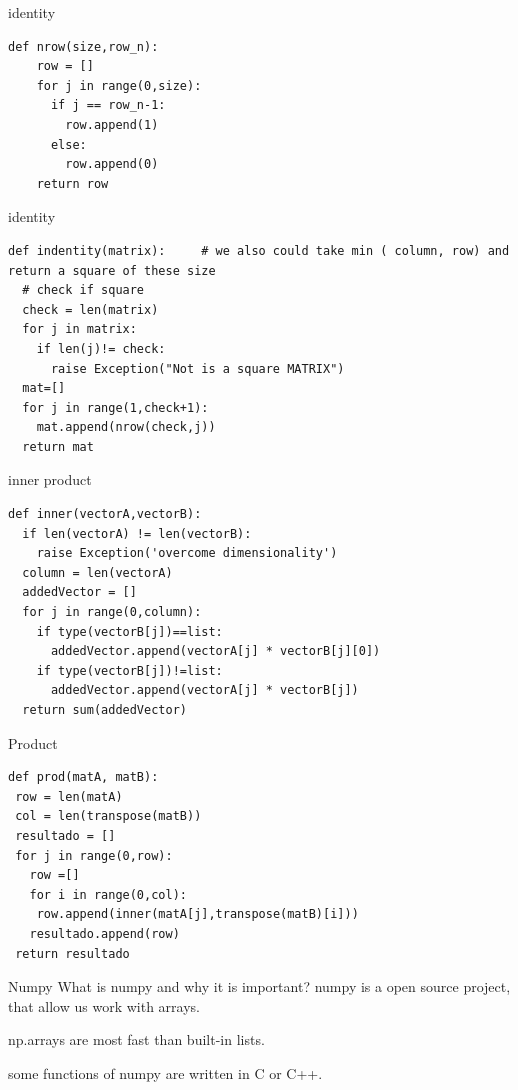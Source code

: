 \documentclass{beamer}
\begin{document}
\begin{frame}[fragile]{identity}
\begin{lstlisting}
def nrow(size,row_n):
    row = []
    for j in range(0,size):
      if j == row_n-1:
        row.append(1)
      else:
        row.append(0)
    return row
\end{lstlisting}
\end{frame}

\begin{frame}[fragile]{identity}
\begin{lstlisting}
def indentity(matrix):     # we also could take min ( column, row) and return a square of these size
  # check if square
  check = len(matrix)
  for j in matrix:
    if len(j)!= check:
      raise Exception("Not is a square MATRIX")
  mat=[]
  for j in range(1,check+1):
    mat.append(nrow(check,j))
  return mat
\end{lstlisting}
\end{frame}



\begin{frame}[fragile]{inner product}
\begin{lstlisting}
def inner(vectorA,vectorB):
  if len(vectorA) != len(vectorB):
    raise Exception('overcome dimensionality')
  column = len(vectorA)
  addedVector = []
  for j in range(0,column):
    if type(vectorB[j])==list:
      addedVector.append(vectorA[j] * vectorB[j][0])
    if type(vectorB[j])!=list:
      addedVector.append(vectorA[j] * vectorB[j])
  return sum(addedVector)
\end{lstlisting}
\end{frame}


\begin{frame}[fragile]{ Product}
\begin{lstlisting}
def prod(matA, matB):
 row = len(matA)
 col = len(transpose(matB))
 resultado = []
 for j in range(0,row):
   row =[]
   for i in range(0,col):
    row.append(inner(matA[j],transpose(matB)[i]))
   resultado.append(row)
 return resultado
\end{lstlisting}
\end{frame}



\begin{frame}{Numpy}
What is numpy and why it is important?
numpy is a open source project, that allow us work with arrays.

np.arrays are most fast than built-in lists.

some functions of numpy are written in C or C++.


\end{frame}
\end{document}
